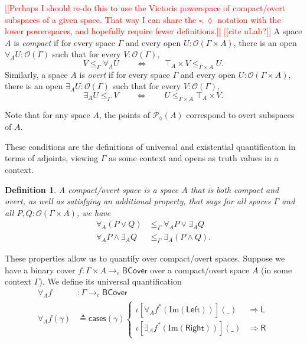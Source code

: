 \documentclass[conference]{IEEEtran}
\newtheorem{definition}{Definition}
\newcommand{\PLower}{\mathcal{P}_\lozenge}
\newcommand{\cto}{\to_c}
\newcommand{\Open}[1]{\mathcal{O}({#1})}
\newcommand{\wildcard}{\_}
\newcommand{\Img}[1]{\text{Im}\left({#1}\right)}
\newcommand{\oinclf}[1]{\iota[{#1}]}
\newcommand{\oincl}[2]{\oinclf{#1} \left({#2}\right)}
\newcommand{\Branch}{\Rightarrow}
\newcommand{\BCover}{\mathsf{BCover}}
\newcommand{\iimg}[1]{{#1}^*}
\newcommand{\note}[1]{\textcolor{red}{[[{#1}]]}}
\begin{document}
\note{Perhaps I should re-do this to use the Vietoris powerspace of compact/overt subspaces of a given space. That way I can share the $\square, \lozenge$ notation with the lower powerspaces, and hopefully require fewer definitions.}
\note{cite nLab?}
A space $A$ is \emph{compact} if for every space $\Gamma$ and every open $U : \Open{\Gamma \times A}$, there is an open $\forall_A U : \Open{\Gamma}$ such that for every $V : \Open{\Gamma},$
\[
V \le_\Gamma \forall_A U \qquad \Leftrightarrow \qquad \top_A \times V \le_{\Gamma \times A} U.
\]
Similarly, a space $A$ is \emph{overt} if for every space $\Gamma$ and every open $U : \Open{\Gamma \times A}$, there is an open $\exists_A U : \Open{\Gamma}$ such that for every $V : \Open{\Gamma},$
\[
\exists_A U \le_\Gamma V  \qquad \Leftrightarrow \qquad U  \le_{\Gamma \times A} \top_A \times V.
\]

Note that for any space $A$, the points of $\PLower(A)$ correspond to overt subspaces of $A$.

These conditions are the definitions of universal and existential quantification in terms of adjoints, viewing $\Gamma$ as some context and opens as truth values in a context.

\begin{definition}
A \emph{compact/overt} space is a space $A$ that is both compact and overt, as well as satisfying an additional property, that says for all spaces $\Gamma$ and all $P, Q : \Open{\Gamma \times A}$, we have
\begin{align*}
\forall_A(P \vee Q) &\le_\Gamma \forall_A P \vee \exists_A Q
\\  \forall_A P \wedge \exists_A Q &\le_\Gamma \exists_A (P \wedge Q).
\end{align*}
\end{definition}
These properties allow us to quantify over compact/overt spaces. Suppose we have a binary cover $f : \Gamma \times A \cto \BCover$ over a compact/overt space $A$ (in some context $\Gamma$). We define its universal quantification
\begin{align*}
\forall_A f &: \Gamma \cto \BCover
\\ \forall_A f(\gamma) &\triangleq \mathsf{cases}(\mathsf{\gamma})
\begin{cases}
\oincl{\forall_A \iimg{f}(\Img{\mathsf{Left}})}{\wildcard} &\Branch \mathsf{L}
\\ \oincl{\exists_A \iimg{f}(\Img{\mathsf{Right}})}{\wildcard} &\Branch \mathsf{R}
\end{cases}
\end{align*}
\end{document}
